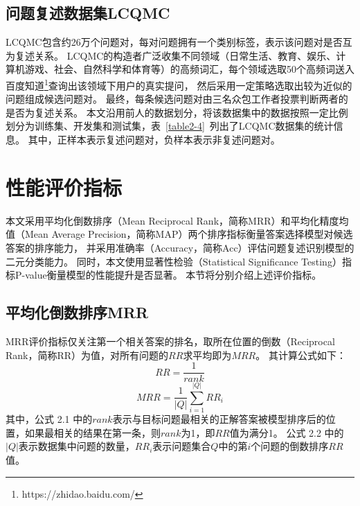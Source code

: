 

\subsection{问题复述数据集LCQMC}


LCQMC包含约26万个问题对，每对问题拥有一个类别标签，表示该问题对是否互为复述关系。
LCQMC的构造者广泛收集不同领域（日常生活、教育、娱乐、计算机游戏、社会、自然科学和体育等）的高频词汇，每个领域选取50个高频词送入百度知道\footnote{https://zhidao.baidu.com/}查询出该领域下用户的真实提问，
然后采用一定策略选取出较为近似的问题组成候选问题对。
最终，每条候选问题对由三名众包工作者投票判断两者的是否为复述关系。
本文沿用前人的数据划分，将该数据集中的数据按照一定比例划分为训练集、开发集和测试集，表~\ref{table2-4}~列出了LCQMC数据集的统计信息。
其中，正样本表示复述问题对，负样本表示非复述问题对。



\section{性能评价指标}
\label{2.3 性能评价指标}

本文采用平均化倒数排序（Mean Reciprocal Rank，简称MRR）和平均化精度均值（Mean Average Precision，简称MAP）两个排序指标衡量答案选择模型对候选答案的排序能力，
并采用准确率（Accuracy，简称Acc）评估问题复述识别模型的二元分类能力。
同时，本文使用显著性检验（Statistical Significance Testing）\cite{dror2018hitchhiker}指标P-value衡量模型的性能提升是否显著。
本节将分别介绍上述评价指标。

\subsection{平均化倒数排序MRR}

MRR评价指标仅关注第一个相关答案的排名，取所在位置的倒数（Reciprocal Rank，简称RR）为值，对所有问题的$RR$求平均即为$MRR$。
其计算公式如下：
\begin{equation}
    RR = \frac{1}{rank}
\end{equation}
\begin{equation}
    MRR = \frac{1}{|Q|} \sum_{i=1}^{|Q|}RR_i
\end{equation}
其中，公式 2.1 中的$rank$表示与目标问题最相关的正解答案被模型排序后的位置，如果最相关的结果在第一条，则$rank$为1，即$RR$值为满分1。
公式 2.2 中的$|Q|$表示数据集中问题的数量，$RR_i$表示问题集合$Q$中的第$i$个问题的倒数排序$RR$值。


